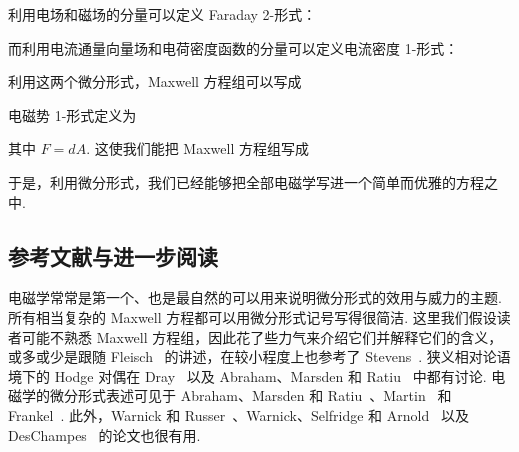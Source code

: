利用电场和磁场的分量可以定义 Faraday 2-形式：

\begin{center}
\end{center}

而利用电流通量向量场和电荷密度函数的分量可以定义电流密度 1-形式：

\begin{center}
\end{center}

利用这两个微分形式，Maxwell 方程组可以写成

\begin{center}
\end{center}

电磁势 1-形式定义为

\begin{center}
\end{center}

其中 $F=dA$. 这使我们能把 Maxwell 方程组写成

\begin{center}
\end{center}

于是，利用微分形式，我们已经能够把全部电磁学写进一个简单而优雅的方程之中.

\subsection{参考文献与进一步阅读}

电磁学常常是第一个、也是最自然的可以用来说明微分形式的效用与威力的主题. 所有相当复杂的 Maxwell 方程都可以用微分形式记号写得很简洁. 这里我们假设读者可能不熟悉 Maxwell 方程组，因此花了些力气来介绍它们并解释它们的含义，或多或少是跟随 Fleisch~\cite{ref20} 的讲述，在较小程度上也参考了 Stevens~\cite{ref42}. 狭义相对论语境下的 Hodge 对偶在 Dray~\cite{ref16} 以及 Abraham、Marsden 和 Ratiu~\cite{ref01} 中都有讨论. 电磁学的微分形式表述可见于 Abraham、Marsden 和 Ratiu~\cite{ref01}、Martin~\cite{ref33} 和 Frankel~\cite{ref21}. 此外，Warnick 和 Russer~\cite{ref48}、Warnick、Selfridge 和 Arnold~\cite{ref49} 以及 DesChampes~\cite{ref13} 的论文也很有用.


